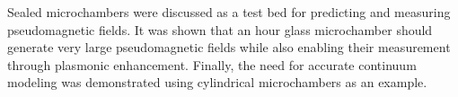 Sealed microchambers were discussed as a test bed for predicting and measuring pseudomagnetic fields.
It was shown that an hour glass microchamber should generate very large pseudomagnetic fields while also enabling their measurement through plasmonic enhancement.
Finally, the need for accurate continuum modeling was demonstrated using cylindrical microchambers as an example.
